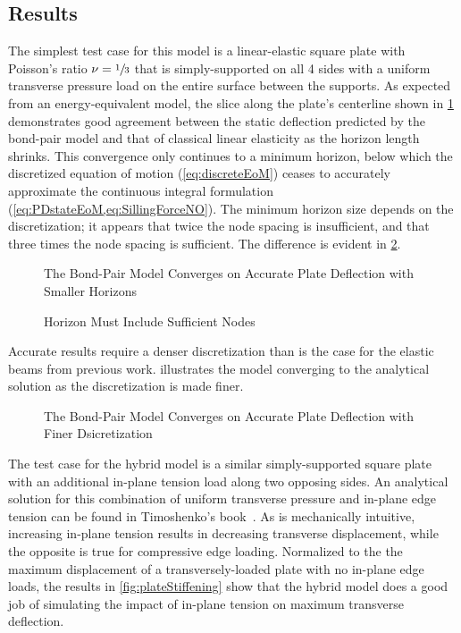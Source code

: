\documentclass[preprint,review,12pt]{elsarticle}
\newcommand{\plotpath}{./plots}
\begin{document}
\subsection{Results}
The simplest test case for this model is a linear-elastic square plate with Poisson's ratio \(\nu = \sfrac{1}{3}\) that is simply-supported on all 4 sides with a uniform transverse pressure load on the entire surface between the supports.
As expected from an energy-equivalent model, the slice along the plate's centerline shown in \cref{fig:plate_convergence_h} demonstrates good agreement between the static deflection predicted by the bond-pair model and that of classical linear elasticity as the horizon length shrinks.
This convergence only continues to a minimum horizon, below which the discretized equation of motion (\cref{eq:discreteEoM}) ceases to accurately approximate the continuous integral formulation (\cref{eq:PDstateEoM,eq:SillingForceNO}).
The minimum horizon size depends on the discretization; it appears that twice the node spacing is insufficient, and that three times the node spacing is sufficient.
The difference is evident in \cref{fig:plate_minimum_h}.

%
\begin{figure}[h]
  \centering
  \resizebox{0.55\linewidth}{!}{}
  \caption{The Bond-Pair Model Converges on Accurate Plate Deflection with Smaller Horizons}
  \label{fig:plate_convergence_h}
\end{figure}

%
\begin{figure}[h]
  \centering
  \resizebox{0.55\linewidth}{!}{}
  \caption{Horizon Must Include Sufficient Nodes}
  \label{fig:plate_minimum_h}
\end{figure}

Accurate results require a denser discretization than is the case for the elastic beams from previous work.
 illustrates the model converging to the analytical solution as the discretization is made finer.

%
\begin{figure}[tbp]
  \centering
  \resizebox{0.55\linewidth}{!}{}
  \caption{The Bond-Pair Model Converges on Accurate Plate Deflection with Finer Dsicretization}
  \label{fig:plate_convergence_n}
\end{figure}

The test case for the hybrid model is a similar simply-supported square plate with an additional in-plane tension load along two opposing sides.
An analytical solution for this combination of uniform transverse pressure and in-plane edge tension can be found in Timoshenko's book~\cite{timoshenko1959theory}.
As is mechanically intuitive, increasing in-plane tension results in decreasing transverse displacement, while the opposite is true for compressive edge loading.
Normalized to the the maximum displacement of a transversely-loaded plate with no in-plane edge loads, the results in \cref{fig:plateStiffening} show that the hybrid model does a good job of simulating the impact of in-plane tension on maximum transverse deflection.
\end{document}
